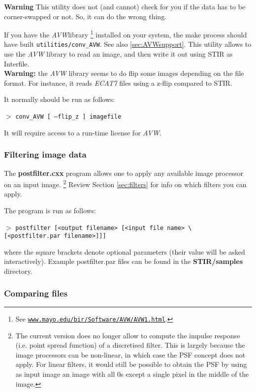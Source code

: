 \documentclass{article}
\def\R2Lurl#1#2{\mbox{\href{#1}{\tt #2}}}
\newcommand{\cmdline}[1]{\par \noindent $>$ \texttt{#1}\par}
\begin{document}
\textbf{Warning} This utility does not (and cannot) check for you 
if the data has to be corner-swapped or not. So, it can do the 
wrong thing.

{ 
}

\label{sec:convAVW}
If you have the \textit{AVW}\texttrademark  library
\footnote{See \R2Lurl{http://www.mayo.edu/bir/Software/AVW/AVW1.html}
{www.mayo.edu/bir/Software/AVW/AVW1.html}.
} installed on your system, the make process should have built \texttt{utilities/conv\_AVW}.
See also \ref{sec:AVWsupport}.
This utility allows to use the \textit{AVW} library to read an image, and then write it out
using STIR as Interfile.\\
\textbf{Warning:} the \textit{AVW} library seems to do flip some images depending
on the file format. For instance, it reads \textit{ECAT7} files using a z-flip compared
to STIR.

It normally should be run as follows:
\cmdline{conv\_AVW [ --flip\_z ] imagefile}

It will require access to a run-time license for \textit{AVW}.


\subsubsection{
Filtering image data}

The \textbf{postfilter.cxx} program allows one to apply any available 
image processor on an input image. \footnote{{\small The current version 
does no longer allow to compute the impulse response (i.e. point 
spread function) of a discretised filter. This is largely because 
the image processors can be non-linear, in which case the PSF 
concept does not apply. For linear filters, it would still be 
possible to obtain the PSF by using as input image an image with 
all 0s except a single pixel in the middle of the image.}} Review 
Section \ref{sec:filters} for info on which filters you can apply.


The program is run as follows:
\cmdline{postfilter [\texttt{<}output filename\texttt{>} [\texttt{<}input file 
name\texttt{>} {\textbackslash}\\
{[}\texttt{<}postfilter.par filename\texttt{>}]]]}


where the square brackets denote optional parameters (their value 
will be asked interactively). Example postfilter.par files can 
be found in the \textbf{STIR/samples} directory.


\subsubsection{
Comparing files}
\end{document}

